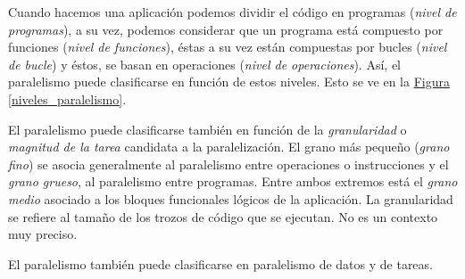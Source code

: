 \documentclass[10pt,a4paper,spanish]{report}
\begin{document}
Cuando hacemos una aplicación podemos dividir el código en programas (\textit{\textcolor[rgb]{0.2,0.4,0.8}{nivel de programas}}), a su vez, podemos considerar que un programa está compuesto por funciones (\textit{\textcolor[rgb]{0.2,0.4,0.8}{nivel de funciones}}), éstas a su vez están compuestas por bucles (\textcolor[rgb]{0.2,0.4,0.8}{\textit{nivel de bucle}}) y éstos, se basan en operaciones (\textit{\textcolor[rgb]{0.2,0.4,0.8}{nivel de operaciones}}). Así, el paralelismo puede clasificarse en función de estos niveles. Esto se ve en la \hyperref[niveles_paralelismo]{Figura \ref*{niveles_paralelismo}}.

El paralelismo puede clasificarse también en función de la \textit{\textcolor[rgb]{0.2,0.4,0.8}{granularidad}} o \textit{\textcolor[rgb]{0.2,0.4,0.8}{magnitud de la tarea}} candidata a la paralelización. El grano más pequeño (\textit{\textcolor[rgb]{0.2,0.4,0.8}{grano fino}}) se asocia generalmente al paralelismo entre operaciones o instrucciones y el \textit{\textcolor[rgb]{0.2,0.4,0.8}{grano grueso}}, al paralelismo entre programas. Entre ambos extremos está el \textit{\textcolor[rgb]{0.2,0.4,0.8}{grano medio}} asociado a los bloques funcionales lógicos de la aplicación. La granularidad se refiere al tamaño de los trozos de código que se ejecutan. No es un contexto muy preciso.

El paralelismo también puede clasificarse en paralelismo de datos y de tareas.
\end{document}
